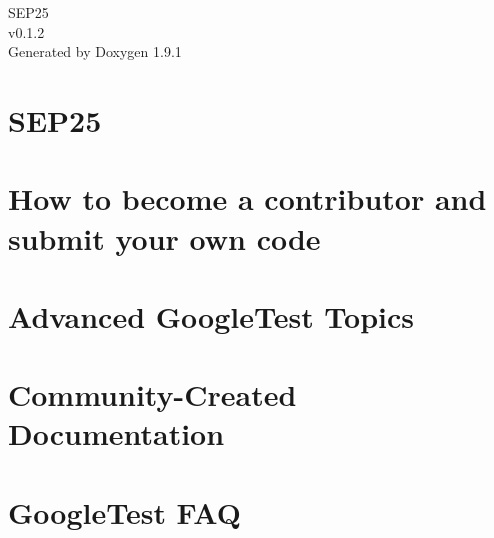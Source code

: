 \let\mypdfximage\pdfximage\def\pdfximage{\immediate\mypdfximage}\documentclass[twoside]{book}
\newcommand{\+}{\discretionary{\mbox{\scriptsize$\hookleftarrow$}}{}{}}
\newcommand{\clearemptydoublepage}{%
  \newpage{\pagestyle{empty}\cleardoublepage}%
}
\begin{document}
\raggedbottom

\hypersetup{pageanchor=false,
             bookmarksnumbered=true,
             pdfencoding=unicode
            }
\begin{titlepage}
\vspace*{7cm}
\begin{center}%
{\Large SEP25 \\[1ex]\large v0.\+1.\+2 }\\
\vspace*{1cm}
{\large Generated by Doxygen 1.9.1}\\
\end{center}
\end{titlepage}
\clearemptydoublepage
{}
\tableofcontents
\clearemptydoublepage
{}
\hypersetup{pageanchor=true}

\chapter{SEP25}
\label{index}\hypertarget{index}{}
\chapter{How to become a contributor and submit your own code}
\label{md__home_omar_SEP25_build__deps_googletest_src_CONTRIBUTING}

\chapter{Advanced Google\+Test Topics}
\label{md__home_omar_SEP25_build__deps_googletest_src_docs_advanced}

\chapter{Community-\/\+Created Documentation}
\label{md__home_omar_SEP25_build__deps_googletest_src_docs_community_created_documentation}

\chapter{Google\+Test FAQ}
\label{md__home_omar_SEP25_build__deps_googletest_src_docs_faq}

\end{document}
